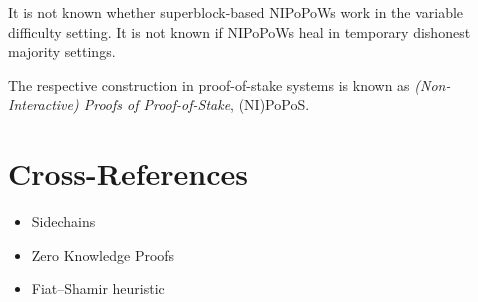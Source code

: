 \documentclass[runningheads]{format/llncs}
\begin{document}
It is not known whether superblock-based NIPoPoWs work in the variable difficulty setting. It is not known if NIPoPoWs heal in temporary dishonest majority settings.

The respective construction in proof-of-stake systems is known as \emph{(Non-Interactive) Proofs of Proof-of-Stake}, (NI)PoPoS.

\section*{Cross-References}
\begin{itemize}
  \item Sidechains
  \item Zero Knowledge Proofs
  \item Fiat--Shamir heuristic
\end{itemize}



\end{document}
